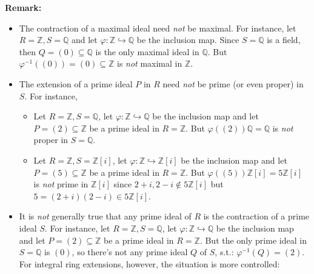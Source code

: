 \noindent\textbf{Remark:} \begin{itemize}
    \item The contraction of a maximal ideal need \textit{not} be maximal. For instance, let $R= \mathbb{Z},S=\mathbb{Q}$ and let $\varphi: \mathbb{Z} \hookrightarrow \mathbb{Q}$ be the inclusion map. Since $S=\mathbb{Q}$ is a field, then $Q=(0) \subseteq \mathbb{Q}$ is the only maximal ideal in $\mathbb{Q}$. But $\varphi^{-1}((0)) = (0) \subseteq \mathbb{Z}$ is \textit{not} maximal in $\mathbb{Z}$.

    \item The extension of a prime ideal $P$ in $R$ need \textit{not} be prime (or even proper) in $S$. For instance,
    \begin{itemize}
        \item Let $R=\mathbb{Z},S=\mathbb{Q}$, let $\varphi: \mathbb{Z} \hookrightarrow \mathbb{Q}$ be the inclusion map and let $P=(2) \subseteq \mathbb{Z}$ be a prime ideal in $R=\mathbb{Z}$. But $\varphi((2)) \mathbb{Q}= \mathbb{Q}$ is \textit{not} proper in $S=\mathbb{Q}$.

        \item Let $R=\mathbb{Z} ,S=\mathbb{Z}[i]$, let $\varphi: \mathbb{Z} \hookrightarrow \mathbb{Z}[i]$ be the inclusion map and let $P=(5) \subseteq \mathbb{Z}$ be a prime ideal in $R=\mathbb{Z}$. But $\varphi((5)) \mathbb{Z}[i] =5\mathbb{Z}[i]$ is \textit{not} prime in $\mathbb{Z}[i]$ since $2+i,2-i \notin 5\mathbb{Z}[i]$ but $5= (2+i)(2-i) \in 5\mathbb{Z}[i]$.
    \end{itemize}

    \item It is \textit{not} generally true that any prime ideal of $R$ is the contraction of a prime ideal $S$. For instance, let $R= \mathbb{Z},S=\mathbb{Q}$, let $\varphi:\mathbb{Z} \hookrightarrow \mathbb{Q}$ be the inclusion map and let $P=(2) \subseteq \mathbb{Z}$ be a prime ideal in $R=\mathbb{Z}$. But the only prime ideal in $S= \mathbb{Q}$ is $(0)$, so there's not any prime ideal $Q$ of $S$, s.t.: $\varphi^{-1} (Q)=(2)$. For integral ring extensions, however, the situation is more controlled:
\end{itemize}

